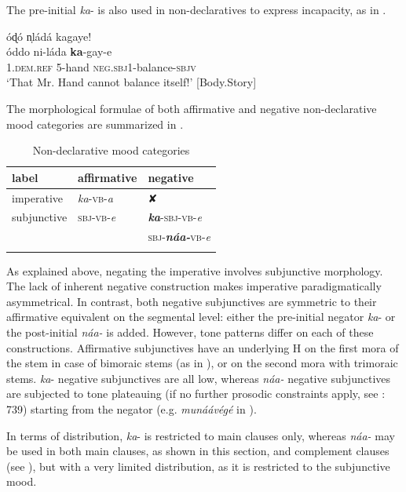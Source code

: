 \documentclass[output=paper,colorlinks=true, citecolor=brown,draftmode]{langscibook}
\begin{document}
\noindent The pre-initial \textit{ka}- is also used in non-declaratives to express incapacity, as in .
\newpage

\ea\label{ex:cuw:13} óɖó n̩ládá kagaye!  \\ 
    \gll  óddo ni-láda \textbf{ka}{}-gay-e \\
           1.\textsc{dem.ref} 5-hand \textsc{neg.sbj1-}balance-\textsc{sbjv}\\
    \glt  ‘That Mr. Hand cannot balance itself!’ [Body.Story]
\z 

The morphological formulae of both affirmative and negative non-declarative mood categories are summarized in . 

\begin{table}
\begin{tabularx}{.6\textwidth}{XXl}
\lsptoprule
{label} & {affirmative} & {negative}\\
\midrule 
{imperative} & {\textit{ka}-\textsc{vb}{}-\textit{a}} & {✘} \\
{subjunctive} & {\textsc{sbj}{}-\textsc{vb}{}-\textit{e}} & {\textit{\textbf{ka}}{}-\textsc{sbj-vb}{}-\textit{e}} \\
& & {\textsc{sbj}{}-\textit{\textbf{náa-}}\textsc{vb}{}-\textit{e}}\\
\lspbottomrule
\end{tabularx}
\caption{Non-declarative mood categories}
\label{tab:cuw:3}
\end{table}

As explained above, negating the imperative involves subjunctive morphology. The lack of inherent negative construction makes imperative paradigmatically asymmetrical. In contrast, both negative subjunctives are symmetric to their affirmative equivalent on the segmental level: either the pre-initial negator \textit{ka}{}- or the post-initial \textit{náa-} is added. However, tone patterns differ on each of these constructions. Affirmative subjunctives have an underlying H on the first mora of the stem in case of bimoraic stems (as in ), or on the second mora with trimoraic stems. \textit{ka}{}- negative subjunctives are all low, whereas \textit{náa-} negative subjunctives are subjected to tone plateauing (if no further prosodic constraints apply, see \citealt{Guérois2019}: 739) starting from the negator (e.g. \textit{munáávégé} in ).

In terms of distribution, \textit{ka}{}- is restricted to main clauses only, whereas \textit{náa-} may be used in both main clauses, as shown in this section, and complement clauses (see ), but with a very limited distribution, as it is restricted to the subjunctive mood.
\end{document}
